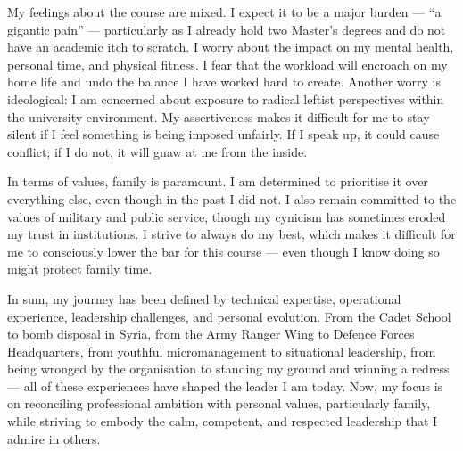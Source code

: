 My feelings about the course are mixed. I expect it to be a major burden --- ``a gigantic pain'' --- particularly as I already hold two Master’s degrees and do not have an academic itch to scratch. I worry about the impact on my mental health, personal time, and physical fitness. I fear that the workload will encroach on my home life and undo the balance I have worked hard to create. Another worry is ideological: I am concerned about exposure to radical leftist perspectives within the university environment. My assertiveness makes it difficult for me to stay silent if I feel something is being imposed unfairly. If I speak up, it could cause conflict; if I do not, it will gnaw at me from the inside.

In terms of values, family is paramount. I am determined to prioritise it over everything else, even though in the past I did not. I also remain committed to the values of military and public service, though my cynicism has sometimes eroded my trust in institutions. I strive to always do my best, which makes it difficult for me to consciously lower the bar for this course --- even though I know doing so might protect family time.

In sum, my journey has been defined by technical expertise, operational experience, leadership challenges, and personal evolution. From the Cadet School to bomb disposal in Syria, from the Army Ranger Wing to Defence Forces Headquarters, from youthful micromanagement to situational leadership, from being wronged by the organisation to standing my ground and winning a redress --- all of these experiences have shaped the leader I am today. Now, my focus is on reconciling professional ambition with personal values, particularly family, while striving to embody the calm, competent, and respected leadership that I admire in others.

